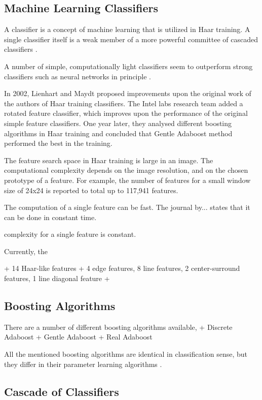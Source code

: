 \documentclass[12pt,a4paper,oneside,pdftex]{report}
\begin{document}
\subsection{Machine Learning Classifiers}

A classifier is a concept of machine learning that is utilized in Haar training. A single classifier itself is a weak member of a more powerful committee of cascaded classifiers \cite{Freund96}. 

A number of simple, computationally light classifiers seem to outperform strong classifiers such as neural networks in principle \cite{Lienhart03}. 

In 2002, Lienhart and Maydt \cite{Lienhart02} proposed improvements upon the original work of the authors of Haar training classifiers. The Intel labs research team added a rotated feature classifier, which improves upon the performance of the original simple feature classifiers. One year later, they analysed different boosting algorithms in Haar training and concluded that Gentle Adaboost method performed the best in the training. 

The feature search space in Haar training is large in an image. The computational complexity depends on the image resolution, and on the chosen prototype of a feature.  For example, the number of features for a small window size of 24x24 is reported to total up to 117,941 features\cite{Lienhart03}. 

The computation of a single feature can be fast. The journal by... states that it can be done in constant time.

complexity for a single feature is constant. 

Currently, the 

+ 14 Haar-like features
+ 4 edge features, 8 line features, 2 center-surround features, 1 line diagonal feature
+ 

\subsection{Boosting Algorithms}

There are a number of different boosting algorithms available, 
+ Discrete Adaboost
+ Gentle Adaboost 
+ Real Adaboost

All the mentioned boosting algorithms are identical in classification sense, but they differ in their parameter learning algorithms \cite{Lienhart03}.

\subsection{Cascade of Classifiers}
\end{document}
